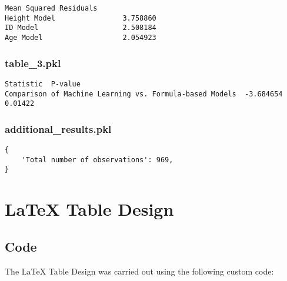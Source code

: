 \documentclass[11pt]{article}
\begin{document}
\begin{Verbatim}[tabsize=4]
              Mean Squared Residuals
Height Model                3.758860
ID Model                    2.508184
Age Model                   2.054923
\end{Verbatim}

\subsubsection*{table\_3.pkl}

\begin{Verbatim}[tabsize=4]
                                                         Statistic  P-value
Comparison of Machine Learning vs. Formula-based Models  -3.684654  0.01422
\end{Verbatim}

\subsubsection*{additional\_results.pkl}

\begin{Verbatim}[tabsize=4]
{
    'Total number of observations': 969,
}
\end{Verbatim}

\section{LaTeX Table Design}
\subsection{{Code}}
The LaTeX Table Design was carried out using the following custom code:
\end{document}
